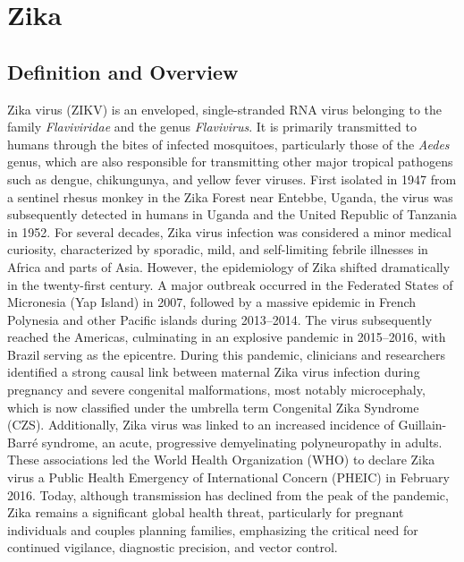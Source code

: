 \chapter{Zika}

\section*{Definition and Overview}
Zika virus (ZIKV) is an enveloped, single-stranded RNA virus belonging to the family \textit{Flaviviridae} and the genus \textit{Flavivirus}. It is primarily transmitted to humans through the bites of infected mosquitoes, particularly those of the \textit{Aedes} genus, which are also responsible for transmitting other major tropical pathogens such as dengue, chikungunya, and yellow fever viruses. First isolated in 1947 from a sentinel rhesus monkey in the Zika Forest near Entebbe, Uganda, the virus was subsequently detected in humans in Uganda and the United Republic of Tanzania in 1952. For several decades, Zika virus infection was considered a minor medical curiosity, characterized by sporadic, mild, and self-limiting febrile illnesses in Africa and parts of Asia. However, the epidemiology of Zika shifted dramatically in the twenty-first century. A major outbreak occurred in the Federated States of Micronesia (Yap Island) in 2007, followed by a massive epidemic in French Polynesia and other Pacific islands during 2013--2014. The virus subsequently reached the Americas, culminating in an explosive pandemic in 2015--2016, with Brazil serving as the epicentre. During this pandemic, clinicians and researchers identified a strong causal link between maternal Zika virus infection during pregnancy and severe congenital malformations, most notably microcephaly, which is now classified under the umbrella term Congenital Zika Syndrome (CZS). Additionally, Zika virus was linked to an increased incidence of Guillain-Barr\'e syndrome, an acute, progressive demyelinating polyneuropathy in adults. These associations led the World Health Organization (WHO) to declare Zika virus a Public Health Emergency of International Concern (PHEIC) in February 2016. Today, although transmission has declined from the peak of the pandemic, Zika remains a significant global health threat, particularly for pregnant individuals and couples planning families, emphasizing the critical need for continued vigilance, diagnostic precision, and vector control.

